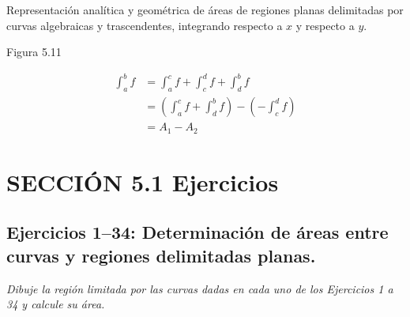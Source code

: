 
Representación analítica y geométrica de áreas de regiones planas delimitadas por curvas algebraicas y trascendentes, integrando respecto a $x$ y respecto a $y$.

\begin{center}

Figura 5.11
\end{center}

\begin{align*}
\int_a^b f &= \int_a^c f + \int_c^d f + \int_d^b f \\
&= \left( \int_a^c f + \int_d^b f \right) - \left( -\int_c^d f \right) \\
&= A_1 - A_2
\end{align*}

\section*{SECCIÓN 5.1 \quad Ejercicios}

\subsection*{Ejercicios 1--34: Determinación de áreas entre curvas y regiones delimitadas planas.}

\noindent \textit{Dibuje la región limitada por las curvas dadas en cada uno de los Ejercicios 1 a 34 y calcule su área.}


